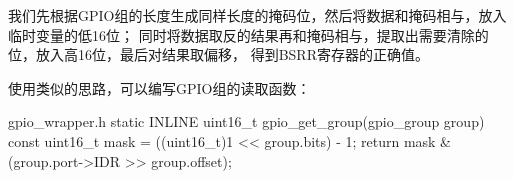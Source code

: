 我们先根据GPIO组的长度生成同样长度的掩码位，然后将数据和掩码相与，放入临时变量的低16位；
同时将数据取反的结果再和掩码相与，提取出需要清除的位，放入高16位，最后对结果取偏移，
得到BSRR寄存器的正确值。

使用类似的思路，可以编写GPIO组的读取函数：

\begin{cbox}{gpio\_wrapper.h}
static INLINE uint16_t
gpio_get_group(gpio_group group)
{
  const uint16_t mask = ((uint16_t)1 << group.bits) - 1;
  return mask & (group.port->IDR >> group.offset);
}
\end{cbox}
